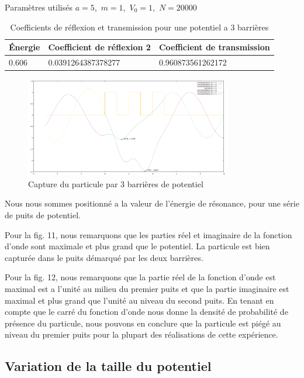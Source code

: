 \begin{table}[!ht]
\centering
Paramètres utilisés  $a=5$,\ $m=1$,\ $V_{0}=1$,\ $ N=20000 $\\
\begin{tabular}{|l|l|l|}
\hline  Énergie & Coefficient de réflexion 2 & Coefficient de transmission \\
\hline  0.606 &  0.0391264387378277 &  0.960873561262172\\
\hline
\end{tabular}
\caption{Coefficients de réflexion et transmission pour une potentiel a 3 barrières}
\label{tab12}
\end{table}

\begin{figure}[!ht]
    \centering
    \includegraphics[width=0.8\textwidth]{3barriersResonnance/PsiReeletImaginaireReson.png}
    \caption{Capture du particule par 3 barrières de potentiel}
    \label{fig:my_label}
\end{figure}

\par Nous nous sommes positionné a la valeur de l'énergie de résonance, pour une série de puits de potentiel. 
\par Pour la fig. 11, nous remarquons que les parties réel et imaginaire de la fonction d'onde sont maximale et plus grand que le potentiel. La particule est bien capturée dans le puits démarqué par les deux barrières. 
\newpage
\par Pour la fig. 12, nous remarquons que la partie réel de la fonction d'onde est maximal est a l'unité au milieu du premier puits et que la partie imaginaire est maximal et plus grand que l'unité au niveau du second puits. En tenant en compte que le carré du fonction d'onde nous donne la densité de probabilité de présence du particule, nous pouvons en conclure que la particule est piégé au niveau du premier puits pour la plupart des réalisations de cette expérience.

\subsection{Variation de la taille du potentiel}


